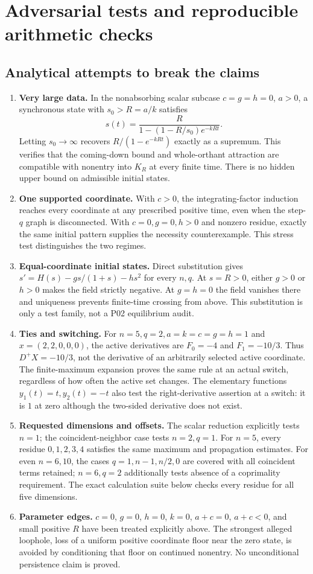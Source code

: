 \documentclass[11pt]{article}
\begin{document}
\section{Adversarial tests and reproducible arithmetic checks}
\subsection{Analytical attempts to break the claims}
\begin{enumerate}
\item \textbf{Very large data.} In the nonabsorbing scalar subcase
$c=g=h=0$, $a>0$, a synchronous state with $s_0>R=a/k$ satisfies
\[
 s(t)=\frac{R}{1-(1-R/s_0)e^{-kRt}}.
\]
Letting $s_0\to\infty$ recovers $R/(1-e^{-kRt})$ exactly as a
supremum. This verifies that the coming-down bound and whole-orthant
attraction are compatible with nonentry into $K_R$ at every finite
time. There is no hidden upper bound on admissible initial states.
\item \textbf{One supported coordinate.} With $c>0$, the integrating-factor
induction reaches every coordinate at any prescribed positive time,
even when the step-$q$ graph is disconnected. With $c=0,g=0,h>0$
and nonzero residue, exactly the same initial pattern supplies the
necessity counterexample. This stress test distinguishes the two regimes.
\item \textbf{Equal-coordinate initial states.} Direct substitution gives
$s'=H(s)-g s/(1+s)-h s^2$ for every $n,q$. At $s=R>0$, either
$g>0$ or $h>0$ makes the field strictly negative. At $g=h=0$ the
field vanishes there and uniqueness prevents finite-time crossing from
above. This substitution is only a test family, not a P02 equilibrium audit.
\item \textbf{Ties and switching.} For $n=5,q=2,a=k=c=g=h=1$ and
$x=(2,2,0,0,0)$, the active derivatives are $F_0=-4$ and
$F_1=-10/3$. Thus $D^+X=-10/3$, not the derivative of an arbitrarily
selected active coordinate. The finite-maximum expansion proves the
same rule at an actual switch, regardless of how often the active set
changes. The elementary functions $y_1(t)=t,y_2(t)=-t$ also test the
right-derivative assertion at a switch: it is $1$ at zero although
the two-sided derivative does not exist.
\item \textbf{Requested dimensions and offsets.} The scalar reduction
explicitly tests $n=1$; the coincident-neighbor case tests $n=2,q=1$.
For $n=5$, every residue $0,1,2,3,4$ satisfies the same maximum and
propagation estimates. For even $n=6,10$, the cases $q=1,n-1,n/2,0$
are covered with all coincident terms retained; $n=6,q=2$ additionally
tests absence of a coprimality requirement. The exact calculation suite
below checks every residue for all five dimensions.
\item \textbf{Parameter edges.} $c=0$, $g=0$, $h=0$, $k=0$,
$a+c=0$, $a+c<0$, and small positive $R$ have been treated explicitly
above. The strongest alleged loophole, loss of a uniform positive
coordinate floor near the zero state, is avoided by conditioning that
floor on continued nonentry. No unconditional persistence claim is proved.
\end{enumerate}
\end{document}
